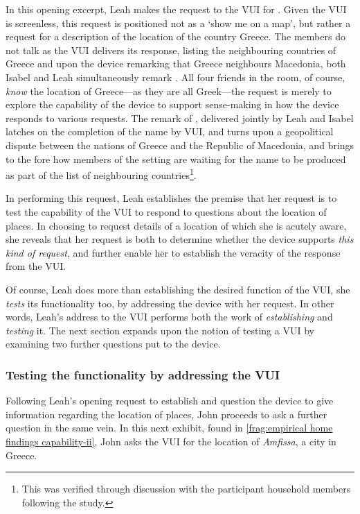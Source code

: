 \begin{revisedsubmission}
In this opening excerpt, Leah makes the request to the \ac{VUI} for .
Given the \ac{VUI} is screenless, this request is positioned not as a `show me on a map', but rather a request for a description of the location of the country Greece.
The members do not talk as the \ac{VUI} delivers its response, listing the neighbouring countries of Greece and upon the device remarking that Greece neighbours Macedonia, both Isabel and Leah simultaneously remark .
All four friends in the room, of course, \textit{know} the location of Greece---as they are all Greek---the request is merely to explore the capability of the device to support sense-making in how the device responds to various requests.
The remark of , delivered jointly by Leah and Isabel latches on the completion of the name  by \ac{VUI}, and turns upon a geopolitical dispute between the nations of Greece and the Republic of Macedonia, and brings to the fore how members of the setting are waiting for the name to be produced as part of the list of neighbouring countries\footnote{This was verified through discussion with the participant household members following the study.}.

In performing this request, Leah establishes the premise that her request is to test the capability of the \ac{VUI} to respond to questions about the location of places.
In choosing to request details of a location of which she is acutely aware, she reveals that her request is both to determine whether the device supports \textit{this kind of request}, and further enable her to establish the veracity of the response from the \ac{VUI}.

Of course, Leah does more than establishing the desired function of the \ac{VUI}, she \textit{tests} its functionality too, by addressing the device with her request.
In other words, Leah's address to the \ac{VUI} performs both the work of \textit{establishing} and \textit{testing} it.
The next section expands upon the notion of testing a \ac{VUI} by examining two further questions put to the device.
\end{revisedsubmission}






\subsubsection{Testing the functionality by addressing the VUI}\label{sec:empirical home findings capability testing}
\begin{revisedsubmission}
Following Leah's opening request to establish and question the device to give information regarding the location of places, John proceeds to ask a further question in the same vein.
In this next exhibit, found in \autoref{frag:empirical home findings capability-ii}, John asks the \ac{VUI} for the location of \textit{Amfissa}, a city in Greece.
\end{revisedsubmission}

